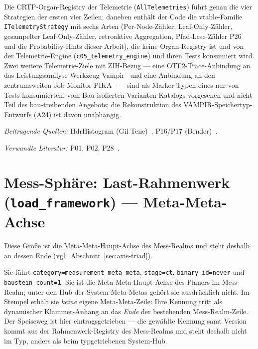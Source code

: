 Die CRTP-Organ-Registry der Telemetrie (\texttt{All\allowbreak{}Telemetries}) führt genau die vier Strategien der ersten vier Zeilen; daneben enthält der Code die vtable-Familie \texttt{ITelemetry\allowbreak{}Strategy} mit sechs Arten (Per-Node-Zähler, Leaf-Only-Zähler, gesampelter Leaf-Only-Zähler, retroaktive Aggregation, Pfad-Lese-Zähler P26 und die Probability-Hints dieser Arbeit), die keine Organ-Registry ist und von der Telemetrie-Engine (\texttt{c05\_\allowbreak{}telemetry\_\allowbreak{}engine}) und ihren Tests konsumiert wird. Zwei weitere Telemetrie-Ziele mit ZIH-Bezug --- eine OTF2-Trace-Anbindung an das Leistungsanalyse-Werkzeug Vampir~\cite{knupfer2008vampir} und eine Anbindung an den zentrumsweiten Job-Monitor PIKA~\cite{dietrich2020pika} --- sind als Marker-Typen eines nur von Tests konsumierten, vom Bau isolierten Varianten-Katalogs vorgesehen und nicht Teil des bau-treibenden Angebots; die Rekonstruktion des VAMPIR-Speichertyp-Entwurfs (A24) ist davon unabhängig.

\emph{Beitragende Quellen:} Hdr\allowbreak{}Histogram (Gil Tene)~\cite{tene_hdrhistogram}, P16/\allowbreak{}P17 (Bender)~\cite{bender2000cobtree,bender2005coboblivious}.

\emph{Verwandte Literatur:} P01, P02, P28~\cite{leis2013art,binna2018hot,kuehn2023bplustree}.

\section[head={Mess-Sphäre: Last-Rahmenwerk --- Meta-Meta-Achse}]{Mess-Sphäre: Last-Rahmenwerk (\texttt{load\_framework}) --- Meta-Meta-Achse}

Diese Größe ist die Meta-Meta-Haupt-Achse des Mess-Realms und steht deshalb an dessen Ende (vgl.\ Abschnitt~\ref{sec:axis-triad}).

Sie führt \texttt{category=measurement\_\allowbreak{}meta\_\allowbreak{}meta}, \texttt{stage=ct}, \texttt{binary\_\allowbreak{}id=never} und \texttt{baustein\_\allowbreak{}count=1}. Sie ist die Meta-Meta-Haupt-Achse des Planers im Mess-Realm; unter den Hub der System-Meta-Metas gehört sie ausdrücklich nicht. Im Stempel erhält sie \emph{keine} eigene Meta-Meta-Zeile: Ihre Kennung tritt als dynamischer Klammer-Anhang an das \emph{Ende} der bestehenden Mess-Realm-Zeile. Der Speiseweg ist hier eintragsgetrieben --- die gewählte Kennung samt Version kommt aus der Rahmenwerk-Registry des Mess-Realms und steht deshalb nicht im Typ, anders als beim typgetriebenen System-Hub.

